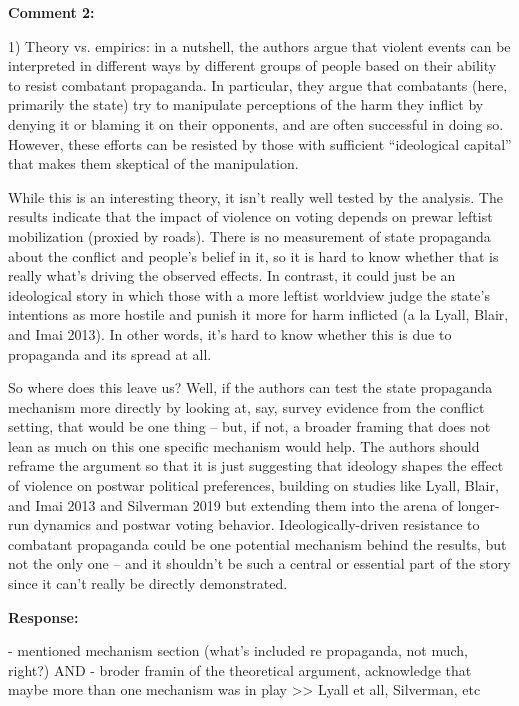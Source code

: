 \documentclass[12pt, a4paper, notitlepage]{article}
\begin{document}
\vspace{15pt}
\noindent\textbf{Comment 2:}
\begin{displayquote}
1) Theory vs. empirics: in a nutshell, the authors argue that violent events can be interpreted in different ways by different groups of people based on their ability to resist combatant propaganda. In particular, they argue that combatants (here, primarily the state) try to manipulate perceptions of the harm they inflict by denying it or blaming it on their opponents, and are often successful in doing so. However, these efforts can be resisted by those with sufficient “ideological capital” that makes them skeptical of the manipulation.

While this is an interesting theory, it isn’t really well tested by the analysis. The results indicate that the impact of violence on voting depends on prewar leftist mobilization (proxied by roads). There is no measurement of state propaganda about the conflict and people’s belief in it, so it is hard to know whether that is really what’s driving the observed effects. In contrast, it could just be an ideological story in which those with a more leftist worldview judge the state’s intentions as more hostile and punish it more for harm inflicted (a la Lyall, Blair, and Imai 2013). In other words, it’s hard to know whether this is due to propaganda and its spread at all.

So where does this leave us? Well, if the authors can test the state propaganda mechanism more directly by looking at, say, survey evidence from the conflict setting, that would be one thing – but, if not, a broader framing that does not lean as much on this one specific mechanism would help. The authors should reframe the argument so that it is just suggesting that ideology shapes the effect of violence on postwar political preferences, building on studies like Lyall, Blair, and Imai 2013 and Silverman 2019 but extending them into the arena of longer-run dynamics and postwar voting behavior. Ideologically-driven resistance to combatant propaganda could be one potential mechanism behind the results, but not the only one – and it shouldn’t be such a central or essential part of the story since it can’t really be directly demonstrated.
\end{displayquote}

\noindent\textbf{Response:} {}

- mentioned mechanism section (what's included re propaganda, not much, right?)
AND
- broder framin of the theoretical argument, acknowledge that maybe more than one mechanism was in play >> Lyall et all, Silverman, etc
\end{document}
